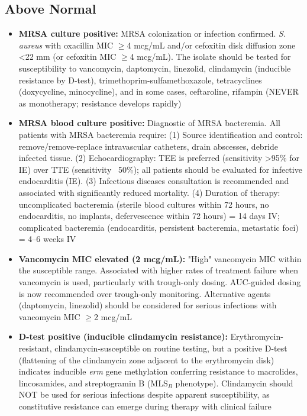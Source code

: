 \subsection*{Above Normal}
\begin{itemize}
  \item \textbf{MRSA culture positive:} MRSA colonization or infection confirmed. \textit{S. aureus} with oxacillin MIC $\geq$4 mcg/mL and/or cefoxitin disk diffusion zone <22 mm (or cefoxitin MIC $\geq$4 mcg/mL). The isolate should be tested for susceptibility to vancomycin, daptomycin, linezolid, clindamycin (inducible resistance by D-test), trimethoprim-sulfamethoxazole, tetracyclines (doxycycline, minocycline), and in some cases, ceftaroline, rifampin (NEVER as monotherapy; resistance develops rapidly)
  \item \textbf{MRSA blood culture positive:} Diagnostic of MRSA bacteremia. All patients with MRSA bacteremia require: (1) Source identification and control: remove/remove-replace intravascular catheters, drain abscesses, debride infected tissue. (2) Echocardiography: TEE is preferred (sensitivity >95\% for IE) over TTE (sensitivity ~50\%); all patients should be evaluated for infective endocarditis (IE). (3) Infectious diseases consultation is recommended and associated with significantly reduced mortality. (4) Duration of therapy: uncomplicated bacteremia (sterile blood cultures within 72 hours, no endocarditis, no implants, defervescence within 72 hours) = 14 days IV; complicated bacteremia (endocarditis, persistent bacteremia, metastatic foci) = 4--6 weeks IV
  \item \textbf{Vancomycin MIC elevated (2 mcg/mL):} "High" vancomycin MIC within the susceptible range. Associated with higher rates of treatment failure when vancomycin is used, particularly with trough-only dosing. AUC-guided dosing is now recommended over trough-only monitoring. Alternative agents (daptomycin, linezolid) should be considered for serious infections with vancomycin MIC $\geq$2 mcg/mL
  \item \textbf{D-test positive (inducible clindamycin resistance):} Erythromycin-resistant, clindamycin-susceptible on routine testing, but a positive D-test (flattening of the clindamycin zone adjacent to the erythromycin disk) indicates inducible \textit{erm} gene methylation conferring resistance to macrolides, lincosamides, and streptogramin B (MLS$_{B}$ phenotype). Clindamycin should NOT be used for serious infections despite apparent susceptibility, as constitutive resistance can emerge during therapy with clinical failure
\end{itemize}

